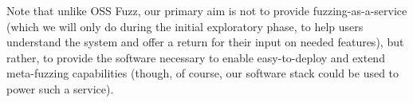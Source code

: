 Note that unlike OSS Fuzz, our primary aim is not to provide
fuzzing-as-a-service (which we will only do during the initial
exploratory phase, to help users understand the system and offer a
return for their input on needed features), but
rather, to provide the software necessary to enable easy-to-deploy and extend meta-fuzzing 
capabilities (though, of course, our software stack could be used to power such a service).

